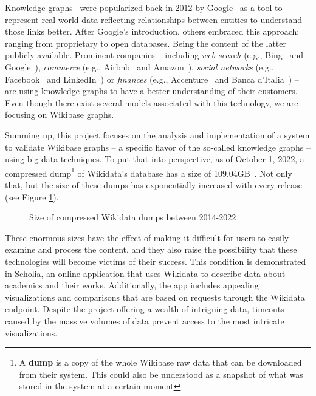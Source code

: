 Knowledge graphs~\cite{https://doi.org/10.48550/arxiv.2110.11709} were popularized back in 2012 by Google~\cite{web:knowledge_graphs:google} as a tool to represent real-world data reflecting relationships between entities to understand those links better. After Google's introduction, others embraced this approach: ranging from proprietary to open databases. Being the content of the latter publicly available. Prominent companies -- including \textit{web search} (e.g., Bing~\cite{knowledge:graphs:usage:bing} and Google~\cite{web:knowledge_graphs:google}), \textit{commerce} (e.g., Airbnb~\cite{knowledge:graphs:usage:airbnb} and Amazon~\cite{knowledge:graphs:usage:amazon}), \textit{social networks} (e.g., Facebook~\cite{knowledge:graphs:usage:facebook} and LinkedIn~\cite{knowledge:graphs:usage:linkedin}) or \textit{finances} (e.g., Accenture~\cite{knowledge:graphs:usage:accenture} and Banca d'Italia~\cite{https://doi.org/10.48550/arxiv.2010.05172}) -- are using knowledge graphs to have a better understanding of their customers. Even though there exist several models associated with this technology, we are focusing on Wikibase graphs.

Summing up, this project focuses on the analysis and implementation of a system to validate Wikibase graphs -- a specific flavor of the so-called knowledge graphs -- using big data techniques. To put that into perspective, as of October 1, 2022, a compressed dump\footnote{A \textbf{dump} is a copy of the whole Wikibase raw data that can be downloaded from their system. This could also be understood as a snapshot of what was stored in the system at a certain moment} of Wikidata's database has a size of 109.04GB~\cite{wikidata:dumps}. Not only that, but the size of these dumps has exponentially increased with every release (see Figure \ref{fig:dumps}).

\begin{figure}[ht]
    \centering
    
    \caption[Plot showing the size of compressed dumps between 2014-22]{Size of compressed Wikidata dumps between 2014-2022~\cite{https://doi.org/10.48550/arxiv.2110.11709}}
    \label{fig:dumps}
\end{figure}

These enormous sizes have the effect of making it difficult for users to easily examine and process the content, and they also raise the possibility that these technologies will become victims of their success. This condition is demonstrated in Scholia, an online application that uses Wikidata to describe data about academics and their works. Additionally, the app includes appealing visualizations and comparisons that are based on requests through the Wikidata endpoint. Despite the project offering a wealth of intriguing data, timeouts caused by the massive volumes of data prevent access to the most intricate visualizations.

